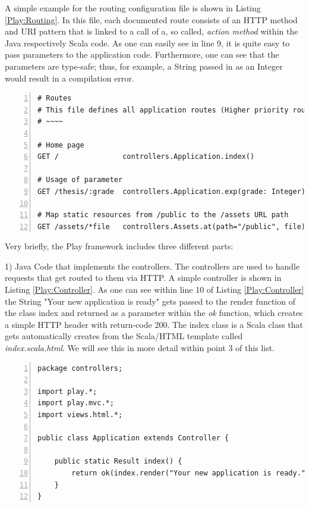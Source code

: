 A simple example for the routing configuration file is shown in Listing \ref{Play:Routing}. In this file, each documented route consists of an \ac{HTTP} method and \ac{URI} pattern that is linked to a call of a, so called, \textit{action method} within the Java respectively Scala code. As one can easily see in line 9, it is quite easy to pass parameters to the application code. Furthermore, one can see that the parameters are type-safe; thus, for example, a String passed in as an Integer would result in a compilation error. 

\begin{lstlisting}[numbers=left,caption={Simple routing configuration file within the Play Framework},label=Play:Routing,frame=tlbr,breaklines]
# Routes
# This file defines all application routes (Higher priority routes first)
# ~~~~

# Home page
GET /               controllers.Application.index()

# Usage of parameter
GET /thesis/:grade  controllers.Application.exp(grade: Integer)

# Map static resources from /public to the /assets URL path
GET /assets/*file   controllers.Assets.at(path="/public", file)
\end{lstlisting}

Very briefly, the Play framework includes three different parts: 

1) Java Code that implements the controllers. The controllers are used to handle requests that get routed to them via \ac{HTTP}. A simple controller is shown in Listing \ref{Play:Controller}. As one can see within line 10 of Listing \ref{Play:Controller} the String "Your new application is ready" gets passed to the render function of the class index and returned as a parameter within the \textit{ok} function, which creates a simple \ac{HTTP} header with return-code 200. The index class is a Scala class that gets automatically creates from the Scala/\ac{HTML} template called \textit{index.scala.html}. We will see this in more detail within point 3 of this list.

\begin{lstlisting}[numbers=left,caption={Simple Java-controller within the Play Framework},label=Play:Controller,frame=tlbr,breaklines]
package controllers;

import play.*;
import play.mvc.*;
import views.html.*;

public class Application extends Controller {

    public static Result index() {
        return ok(index.render("Your new application is ready."));
    }
}
\end{lstlisting}


